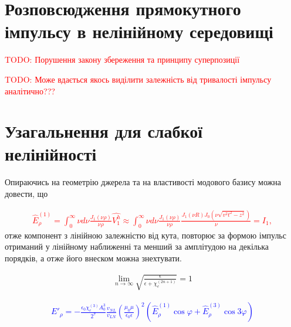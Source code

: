 \section{Розповсюдження прямокутного імпульсу в нелінійному середовищі}

\textcolor{red} {TODO: Порушення закону збереження та принципу суперпозиції}

\textcolor{red} {TODO: Може вдається якось виділити залежність від 
тривалості імпульсу аналітично???}

\section{Узагальнення для слабкої нелінійності}

Опираючись на геометрію джерела та на властивості модового базису можна 
довести, що 

\textcolor{red} { \begin{equation} \begin{aligned} \label{eq:erho_norm}
\hat{E}_\rho^{(1)} = \int_0^\infty \nu d \nu 
\frac{J_1(\nu \rho)}{\nu \rho} \hat{V_1^h} \approx
\int_0^\infty \nu d \nu \frac{J_1(\nu \rho)}{\nu \rho} 
\frac{J_1(\nu R) J_0(\nu \sqrt{v^2t^2-z^2})}{\nu} = I_1,
\end{aligned} \end{equation} }
%
отже компонент з лінійною залежністю від кута, повторює за формою 
імпульс отриманий у лінійному наближенні та менший за амплітудою на 
декілька порядків, а отже його внеском можна знехтувати.

\begin{equation*} \begin{aligned}
\lim_{n \to \infty} 
\sqrt{ \frac{\epsilon}{ \epsilon + \chi_e^{(2n+1)}} } = 1
\end{aligned} \end{equation*}

\textcolor{blue} { \begin{equation*} \begin{aligned}
E'_\rho = - \frac{\epsilon_0 \chi_e^{(3)} A_0^3}{2^7}
\frac{v_{NL}}{v_{LN}}
\left( \frac{\mu_0 \mu}{\epsilon_0 \epsilon} \right)^2
\left(\hat{E}_\rho^{(1)} \cos \varphi +
\hat{E}_\rho^{(3)} \cos 3 \varphi \right)
\end{aligned} \end{equation*} }

